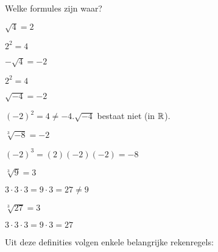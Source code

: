 \documentclass{ximera}
\begin{document}
\begin{exercise} Welke formules zijn waar?

    \begin{xmmulticols}[3]
    \begin{question} 
        \choiceTrue $\sqrt{4} = 2$
        \begin{feedback} $2 ^2 = 4$ \end{feedback}
    \end{question}
    \begin{question} 
        \choiceTrue $-\sqrt{4} = -2$
        \begin{feedback} $2 ^2 = 4$ \end{feedback}
    \end{question}
    \begin{question} 
        \choiceFalse $\sqrt{-4} = -2$
        \begin{feedback} $(-2)^2 = 4 \neq -4. \sqrt{-4}$ bestaat niet (in $\mathbb{R}$). \end{feedback}
    \end{question}
    \begin{question} 
        \choiceTrue $\sqrt[3]{-8} = -2$
        \begin{feedback} $(-2)^3 = (2)(-2)(-2) = -8$ \end{feedback}
    \end{question}
    \begin{question} 
        \choiceFalse $\sqrt[3]{9} = 3$
        \begin{feedback} $3\cdot3\cdot3 = 9\cdot3 = 27 \neq 9$ \end{feedback}
    \end{question}
    \begin{question} 
        \choiceTrue $\sqrt[3]{27} = 3$
        \begin{feedback} $3\cdot3\cdot3 = 9\cdot3 = 27$ \end{feedback}
    \end{question}

\end{xmmulticols}

\end{exercise}


Uit deze definities volgen enkele belangrijke rekenregels: 
\end{document}

